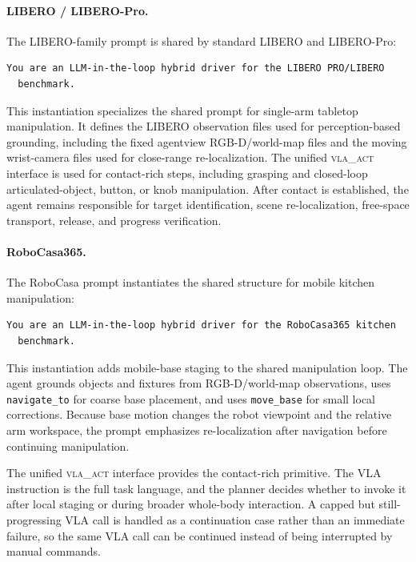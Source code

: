 \documentclass[11pt]{article}
\begin{document}
 \paragraph{LIBERO / LIBERO-Pro.}
  The LIBERO-family prompt is shared by standard LIBERO and LIBERO-Pro:

  \begin{lstlisting}[frame=single,framerule=0.5pt]
  You are an LLM-in-the-loop hybrid driver for the LIBERO PRO/LIBERO
  benchmark.
  \end{lstlisting}

  This instantiation specializes the shared prompt for single-arm tabletop manipulation.
  It defines the LIBERO observation files used for perception-based grounding, including
  the fixed agentview RGB-D/world-map files and the moving wrist-camera files used for
  close-range re-localization. The unified \textsc{vla\_act} interface is used for
  contact-rich steps, including grasping and closed-loop articulated-object, button, or knob
  manipulation. After contact is established, the agent remains responsible for target
  identification, scene re-localization, free-space transport, release, and progress
  verification.

  \paragraph{RoboCasa365.}
  The RoboCasa prompt instantiates the shared structure for mobile kitchen manipulation:

  \begin{lstlisting}[frame=single,framerule=0.5pt]
  You are an LLM-in-the-loop hybrid driver for the RoboCasa365 kitchen
  benchmark.
  \end{lstlisting}

  This instantiation adds mobile-base staging to the shared manipulation loop. The agent
  grounds objects and fixtures from RGB-D/world-map observations, uses
  \texttt{navigate\_to} for coarse base placement, and uses \texttt{move\_base} for
  small local corrections. Because base motion changes the robot viewpoint and the
  relative arm workspace, the prompt emphasizes re-localization after navigation before
  continuing manipulation.

  The unified \textsc{vla\_act} interface provides the contact-rich primitive. The VLA
  instruction is the full task language, and the planner decides whether to invoke it
  after local staging or during broader whole-body interaction. A capped but
  still-progressing VLA call is handled as a continuation case rather than an immediate
  failure, so the same VLA call can be
  continued instead of being interrupted by manual commands.
\end{document}

